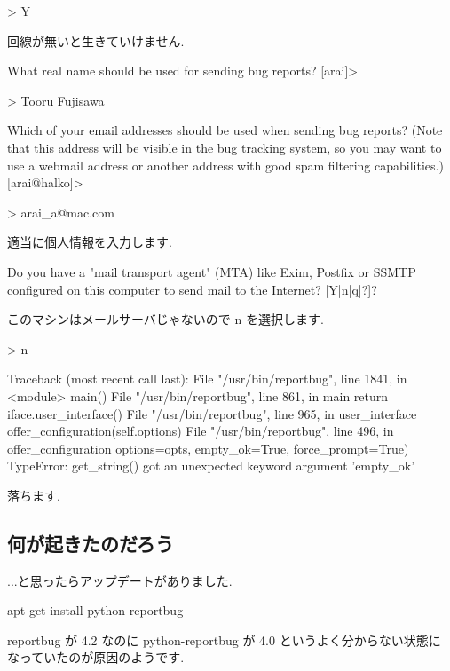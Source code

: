 \documentclass[mingoth,a4paper]{jsarticle}
\begin{document}
\begin{commandline}
\begin{commandline}
> Y
\end{commandline}

回線が無いと生きていけません.

\begin{commandline}
What real name should be used for sending bug reports?
[arai]> 

> Tooru Fujisawa

Which of your email addresses should be used when sending bug reports? (Note
that this address will be visible in the bug tracking system, so you may want
to use a webmail address or another address with good spam filtering
capabilities.)
[arai@halko]> 

> arai_a@mac.com
\end{commandline}

適当に個人情報を入力します.

\begin{commandline}
Do you have a "mail transport agent" (MTA) like Exim, Postfix or SSMTP
configured on this computer to send mail to the Internet? [Y|n|q|?]? 
\end{commandline}

このマシンはメールサーバじゃないので n を選択します.

\begin{commandline}
> n

Traceback (most recent call last):
  File "/usr/bin/reportbug", line 1841, in <module>
    main()
  File "/usr/bin/reportbug", line 861, in main
    return iface.user_interface()
  File "/usr/bin/reportbug", line 965, in user_interface
    offer_configuration(self.options)
  File "/usr/bin/reportbug", line 496, in offer_configuration
    options=opts, empty_ok=True, force_prompt=True)
TypeError: get_string() got an unexpected keyword argument 'empty_ok'
\end{commandline}

落ちます.

\subsection{何が起きたのだろう}

...と思ったらアップデートがありました.

\begin{commandline}
apt-get install python-reportbug
\end{commandline}

reportbug が 4.2 なのに python-reportbug が 4.0 というよく分からない状態に
なっていたのが原因のようです.


\end{commandline}
\end{document}
